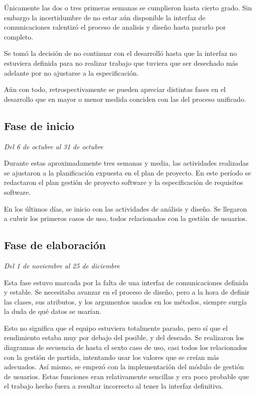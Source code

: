 Únicamente las dos o tres primeras semanas se cumplieron hasta cierto grado.
Sin embargo la incertidumbre de no estar aún disponible la interfaz de
comunicaciones ralentizó el proceso de analisis y diseño hasta pararlo por
completo.

Se tomó la decisión de no continuar con el desarrolló hasta que la interfaz no
estuviera definida para no realizar trabajo que tuviera que ser desechado más
adelante por no ajustarse a la especificación.

Aún con todo, retrospectivamente se pueden apreciar distintas fases en el
desarrollo que en mayor o menor medida conciden con las del proceso unificado.

\subsection{Fase de inicio}

\textit{Del 6 de octubre al 31 de octubre}

Durante estas aproximadamente tres semanas y media, las actividades realizadas
se ajustaron a la planificación expuesta en el plan de proyecto. En este
período se redactaron el plan gestión de proyecto software y la especificación
de requisitos software.

En los últimos días, se inicio con las actividades de análisis y diseño. Se
llegaron a cubrir los primeros casos de uso, todos relacionados con la gestión
de usuarios.

\subsection{Fase de elaboración}

\textit{Del 1 de noviembre al 25 de diciembre}

Esta fase estuvo marcada por la falta de una interfaz de comunicaciones
definida y estable. Se necesitaba avanzar en el proceso de diseño, pero a la
hora de definir las clases, sus atributos, y los argumentos usados en los
métodos, siempre surgía la duda de qué datos se usarían.

Esto no significa que el equipo estuviera totalmente parado, pero sí que el
rendimiento estaba muy por debajo del posible, y del deseado. Se realizaron los
diagramas de secuencia de hasta el sexto caso de uso, casi todos los
relacionados con la gestión de partida, intentando usar los valores que se
creían más adecuados. Así mismo, se empezó con la implementación del módulo de
gestión de usuarios. Estas funciones eran relativamente sencillas y era poco
probable que el trabajo hecho fuera a resultar incorrecto al tener la interfaz
definitiva.

